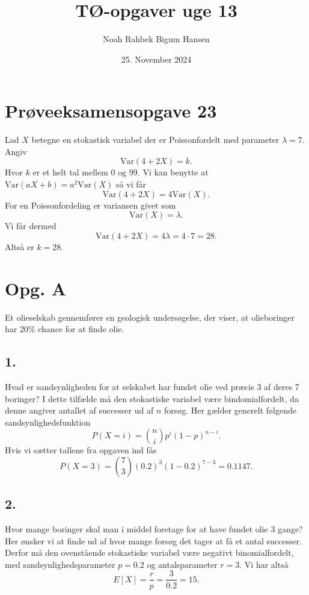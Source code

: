 \documentclass[12pt]{article}
\title{TØ-opgaver uge 13}
\author{Noah Rahbek Bigum Hansen}
\date{25. November 2024}
\theoremstyle{definition}
\begin{document}
\maketitle

\section*{Prøveeksamensopgave 23}
Lad $X$ betegne en stokastisk variabel der er Poissonfordelt med parameter $\lambda = 7$. Angiv
\[ 
  \mathrm{Var}(4+2X) = k
.\]
Hvor $k$ er et helt tal mellem 0 og 99.
\bigbreak
Vi kan benytte at $\mathrm{Var}(aX + b) = a^2\mathrm{Var}(X)$ så vi får
\[ 
  \mathrm{Var}(4 + 2X) = 4 \mathrm{Var}(X)
.\]
For en Poissonfordeling er variansen givet som
\[ 
  \mathrm{Var}(X) = \lambda
.\]
Vi får dermed
\[ 
  \mathrm{Var}(4 + 2X) = 4 \lambda = 4 \cdot 7 = 28
.\]
Altså er $k = 28$.

\section*{Opg. A}
Et olieselskab gennemfører en geologisk undersøgelse, der viser, at olieboringer har 20\% chance for at finde olie.

\subsection*{1.}
Hvad er sandsynligheden for at selskabet har fundet olie ved præcis 3 af deres 7 boringer?
\bigbreak
I dette tilfælde må den stokastiske variabel være bindomialfordelt, da denne angiver antallet af successer ud af $n$ forsøg. Her gælder generelt følgende sandsynlighedsfunktion
\[ 
P(X = i) = \binom{n}{i} p^{i}(1-p)^{n-i}
.\]
Hvis vi sætter tallene fra opgaven ind fås
\[ 
P(X = 3) = \binom{7}{3} (\num{0,2})^{3}(1-\num{0,2})^{7-3} = \num{0,1147}  
.\]


\subsection*{2.}
Hvor mange boringer skal man i middel foretage for at have fundet olie 3 gange?
\bigbreak
Her ønsker vi at finde ud af hvor mange forsøg det tager at få et antal successer. Derfor må den ovenstående stokastiske variabel være negativt binomialfordelt, med sandsynlighedsparameter $p = \num{0,2}$ og antalsparameter $r = 3$. Vi har altså
\[ 
  E[X] = \frac{r}{p} = \frac{3}{\num{0,2}} = 15
.\]
\end{document}
